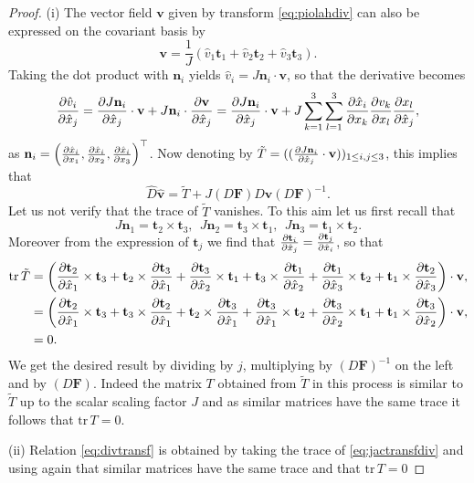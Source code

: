 \begin{proof}
(i) The vector field $ \mathbf{v}$ given by transform \eqref{eq:piolahdiv} can also be expressed on the covariant basis by
$$ \mathbf{v} = \frac{1}{J} ( \hat{v}_1 \mathbf{t}_1 + \hat{v}_2 \mathbf{t}_2 + \hat{v}_3 \mathbf{t}_3).$$
Taking the dot product with $ \mathbf{n}_i$  yields
$ \hat{v}_i =  J \mathbf{n}_i \cdot \mathbf{v}$, so that the derivative becomes
$$ \frac{\partial  \hat{v}_i}{\partial  \hat{x}_j} = \frac{\partial  J   \mathbf{n}_i }{\partial  \hat{x}_j}  \cdot  \mathbf{v} +
J   \mathbf{n}_i \cdot \frac{\partial  \mathbf{v} }{\partial  \hat{x}_j}
= \frac{\partial  J   \mathbf{n}_i }{\partial  \hat{x}_j}  \cdot  \mathbf{v} +
J  \sum_{k=1}^3 \sum_{l=1}^3\frac{\partial  \hat{x}_i }{\partial  x_k}  \frac{\partial  v_k }{\partial x_l}\frac{\partial x_l}{\partial  \hat{x}_j},
$$ 
as $\mathbf{n}_i = \left( \frac{\partial  \hat{x}_i }{\partial  x_1}, \frac{\partial  \hat{x}_i }{\partial  x_2}, \frac{\partial  \hat{x}_i }{\partial  x_3}\right)^\top$. Now denoting by $\tilde{T} = ((\frac{\partial  J   \mathbf{n}_i }{\partial  \hat{x}_j}  \cdot  \mathbf{v}))_{1\leq i,j \leq 3}$, this implies  that 
$$ \hat{D} \mathbf{\hat{v}} = \tilde{T} + J (D \mathbf{F}) D \mathbf{v} (D \mathbf{F})^{-1}.$$
Let us not verify that the trace of $\tilde{T}$ vanishes. To this aim let us first recall that
$$ J\mathbf{n}_1= \mathbf{t}_2\times \mathbf{t}_3, ~~ J\mathbf{n}_2= \mathbf{t}_3\times \mathbf{t}_1, ~~ J\mathbf{n}_3= \mathbf{t}_1\times \mathbf{t}_2.$$
Moreover from the expression of $ \mathbf{t}_j$ we find that $\frac{\partial  \mathbf{t}_i}{\partial  \hat{x}_j}=
\frac{\partial  \mathbf{t}_j}{\partial  \hat{x}_i}$, so that
\begin{align*}
\mathrm{tr}\, \tilde{T} &= \left( \frac{\partial \mathbf{t}_2}{\partial  \hat{x}_1}\times \mathbf{t}_3
+ \mathbf{t}_2\times \frac{\partial \mathbf{t}_3}{\partial  \hat{x}_1} +
\frac{\partial \mathbf{t}_3}{\partial  \hat{x}_2}\times \mathbf{t}_1
+ \mathbf{t}_3\times \frac{\partial \mathbf{t}_1}{\partial  \hat{x}_2} +
\frac{\partial \mathbf{t}_1}{\partial  \hat{x}_3}\times \mathbf{t}_2
+ \mathbf{t}_1\times \frac{\partial \mathbf{t}_2}{\partial  \hat{x}_3}
\right) \cdot \mathbf{v},\\
&= \left( \frac{\partial \mathbf{t}_2}{\partial  \hat{x}_1}\times \mathbf{t}_3 +
\mathbf{t}_3\times \frac{\partial \mathbf{t}_2}{\partial  \hat{x}_1} +
 \mathbf{t}_2\times \frac{\partial \mathbf{t}_3}{\partial  \hat{x}_1} +
 \frac{\partial \mathbf{t}_3}{\partial  \hat{x}_1}\times \mathbf{t}_2 +
\frac{\partial \mathbf{t}_3}{\partial  \hat{x}_2}\times \mathbf{t}_1 + 
 \mathbf{t}_1\times \frac{\partial \mathbf{t}_3}{\partial  \hat{x}_2}
\right) \cdot \mathbf{v}, \\
&=0.
\end{align*} 
We get the desired result by dividing by $j$, multiplying by $(D \mathbf{F})^{-1}$ on the left and by
$(D \mathbf{F})$. Indeed the matrix $T$ obtained from  $\tilde{T}$ in this process is similar to $ \tilde{T} $ up to the scalar scaling factor $J$ and as similar matrices have the same trace it follows that 
$\mathrm{tr}\,T=0$.

(ii) Relation \eqref{eq:divtransf} is obtained by taking the trace of \eqref{eq:jactransfdiv} and using again that similar matrices have the same trace and that $\mathrm{tr} \,T=0$

\end{proof}


